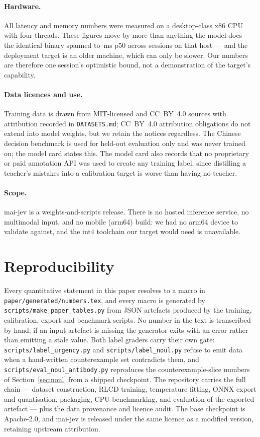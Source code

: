 \documentclass[11pt,a4paper]{article}
\begin{document}
\paragraph{Hardware.} All latency and memory numbers were measured on a desktop-class x86 CPU with four threads. These figures move by more than anything the model does --- the identical binary spanned \LatPFiveZeroBest{} to \LatPFiveZeroWorst\,ms p50 across \LatSessions{} sessions on that host --- and the deployment target is an older machine, which can only be slower. Our numbers are therefore one session's optimistic bound, not a demonstration of the target's capability.

\paragraph{Data licences and use.} Training data is drawn from MIT-licensed and CC~BY~4.0 sources with attribution recorded in \texttt{DATASETS.md}; CC~BY~4.0 attribution obligations do not extend into model weights, but we retain the notices regardless. The Chinese decision benchmark is used for held-out evaluation only and was never trained on; the model card states this. The model card also records that no proprietary or paid annotation API was used to create any training label, since distilling a teacher's mistakes into a calibration target is worse than having no teacher.

\paragraph{Scope.} mai-jev is a weights-and-scripts release. There is no hosted inference service, no multimodal input, and no mobile (arm64) build: we had no arm64 device to validate against, and the int4 toolchain our target would need is unavailable.

\section{Reproducibility}

Every quantitative statement in this paper resolves to a macro in \texttt{paper/generated/numbers.tex}, and every macro is generated by \texttt{scripts/make\_paper\_tables.py} from JSON artefacts produced by the training, calibration, export and benchmark scripts. No number in the text is transcribed by hand; if an input artefact is missing the generator exits with an error rather than emitting a stale value. Both label graders carry their own gate: \texttt{scripts/label\_urgency.py} and \texttt{scripts/label\_noul.py} refuse to emit data when a hand-written counterexample set contradicts them, and \texttt{scripts/eval\_noul\_antibody.py} reproduces the counterexample-slice numbers of Section~\ref{sec:noul} from a shipped checkpoint. The repository carries the full chain --- dataset construction, RLCD training, temperature fitting, ONNX export and quantisation, packaging, CPU benchmarking, and evaluation of the exported artefact --- plus the data provenance and licence audit. The base checkpoint is Apache-2.0, and mai-jev is released under the same licence as a modified version, retaining upstream attribution.



\end{document}
